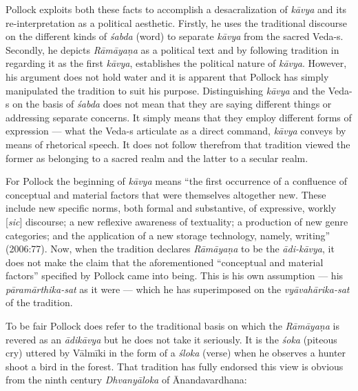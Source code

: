 Pollock exploits both these facts to accomplish a desacralization
 of \textsl{kāvya} and its re-interpretation as a political aesthetic. Firstly, he uses the traditional discourse on the different kinds of \textsl{śabda} (word) to separate \textsl{kāvya} from the sacred Veda-s. Secondly, he depicts \textsl{Rāmāyaṇa} as a political text and by following tradition in regarding it as the first \textsl{kāvya}, establishes the political nature of \textsl{kāvya}. However, his argument does not hold water and it is apparent that Pollock has simply manipulated the tradition to suit his purpose. Distinguishing \textsl{kāvya} and the Veda-s on the basis of \textsl{śabda} does not mean that they are saying different things or addressing separate concerns. It simply means that they employ different forms of expression --- what the Veda-s articulate as a direct command, \textsl{kāvya} conveys by means of rhetorical speech. It does not follow therefrom that tradition viewed the former as belonging to a sacred realm and the latter to a secular realm. 

For Pollock the beginning of \textsl{kāvya} means ``the first occurrence of a confluence of conceptual and material factors that were themselves altogether new. These include new specific norms, both formal and substantive, of expressive, workly [\textsl{sic}] discourse; a new reflexive awareness of textuality; a production of new genre categories; and the application of a new storage technology, namely, writing'' (2006:77). Now, when the tradition declares \textsl{Rāmāyaṇa} to be the \textsl{ādi-kāvya}, it does not make the claim that the aforementioned ``conceptual and material factors'' specified by Pollock came into being. This is his own assumption --- his \textsl{pāramārthika-sat} as it were --- which he has superimposed on the \textsl{vyāvahārika-sat} of the tradition.

To be fair Pollock does refer to the traditional basis on which the \textsl{Rāmāyaṇa} is revered as an \textsl{ādikāvya} but he does not take it seriously. It is the \textsl{śoka} (piteous cry) uttered by Vālmīki in the form of a \textsl{śloka} (verse) when he observes a hunter shoot a bird in the forest. That tradition has fully endorsed this view is obvious from the ninth century \textsl{Dhvanyāloka} of Ānandavardhana: 

